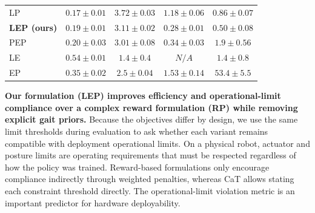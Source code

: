 \documentclass{article}
\newcommand{\baselineTwo}{LP}
\newcommand{\baselineFour}{LEP}
\newcommand{\baselineFive}{RP}
\newcommand{\baselineSix}{EP}
\newcommand{\baselineFourBlind}{LE}
\begin{document}
\begin{table}[t]
\begin{tabular}{@{}lcccc@{}}
            \baselineTwo & \(\mathbf{0.17 \pm 0.01}\) & \(\mathbf{3.72 \pm 0.03}\) & \(1.18 \pm 0.06\) & \(0.86 \pm 0.07\) \\
            \textbf{\baselineFour{} (ours)} & \(0.19 \pm 0.01\) & \(3.11 \pm 0.02\) & \(\mathbf{0.28 \pm 0.01}\) & \(\mathbf{0.50 \pm 0.08}\) \\
            PEP & \(0.20 \pm 0.03\) & \(3.01 \pm 0.08\) & \(0.34 \pm 0.03\) & \(1.9 \pm 0.56\) \\
            \baselineFourBlind & \(0.54 \pm 0.01\) & \(1.4 \pm 0.4\) & \(N/A\) & \(1.4 \pm 0.8\) \\
            \baselineSix & \(0.35 \pm 0.02\) & \(2.5 \pm 0.04\) & \(1.53 \pm 0.14\) & \(53.4 \pm 5.5\) \\
            \bottomrule
        \end{tabular}
    \end{table}

    \textbf{Our formulation (\baselineFour{}) improves efficiency and operational-limit compliance over a complex reward formulation (\baselineFive{}) while removing explicit gait priors.}
    Because the objectives differ by design, we use the same limit thresholds during evaluation to ask whether each variant remains compatible with deployment operational limits.
    On a physical robot, actuator and posture limits are operating requirements that must be respected regardless of how the policy was trained. 
    Reward-based formulations only encourage compliance indirectly through weighted penalties, whereas CaT allows stating each constraint threshold directly. 
    The operational-limit violation metric is an important predictor for hardware deployability.
\end{document}
